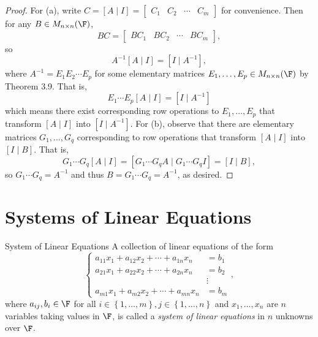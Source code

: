 \documentclass[linearalgebra]{subfiles}
\begin{document}
    \begin{proof}
        For (a), write $C = [A\mid I] = \begin{bmatrix} C_1 & C_2 & \cdots & C_m \end{bmatrix}$ for convenience. Then for any $B\in M_{n\times n}(\F)$,
        \begin{equation*}
            BC = 
            \begin{bmatrix}
                BC_1 & BC_2 & \cdots & BC_m
            \end{bmatrix},
        \end{equation*}
        so
        \begin{equation*}
            A^{-1}[A\mid I] = [I\mid A^{-1}],
        \end{equation*}
        where $A^{-1} = E_1E_2\cdots E_p$ for some elementary matrices $E_1, \ldots, E_p\in M_{n\times n}(\F)$ by Theorem 3.9. That is,
        \begin{equation*}
            E_1\cdots E_p [A\mid I] = [I\mid A^{-1}]
        \end{equation*}
        which means there exist corresponding row operations to $E_1, \ldots, E_p$ that transform $[A\mid I]$ into $[I\mid A^{-1}]$. For (b), observe that there are elementary matrices $G_1, \ldots, G_q$ corresponding to row operations that transform $[A\mid I]$ into $[I\mid B]$. That is,
        \begin{equation*}
            G_1\cdots G_q [A\mid I] = [G_1\cdots G_qA\mid G_1\cdots G_qI] = [I\mid B],
        \end{equation*}
        so $G_1\cdots G_q = A^{-1}$ and thus $B = G_1\cdots G_q = A^{-1}$, as desired.
    \end{proof}

    \section{Systems of Linear Equations}

    \begin{definition}{System of Linear Equations}{}
        A collection of linear equations of the form
        \begin{equation*}
            \begin{cases}
                a_{11}x_1 + a_{12}x_2 + \cdots + a_{1n}x_n & = b_1 \\
                a_{21}x_1 + a_{22}x_2 + \cdots + a_{2n}x_n & = b_2 \\
                                                           & \vdots \\
                a_{m1}x_1 + a_{m2}x_2 + \cdots + a_{mn}x_n & = b_m
            \end{cases},
        \end{equation*}
        where $a_{ij}, b_i\in \F$ for all $i\in \left\lbrace 1, \ldots, m \right\rbrace, j\in \left\lbrace 1, \ldots, n \right\rbrace$ and $x_1, \ldots, x_n$ are $n$ variables taking values in $\F$, is called a \emph{system of linear equations} in $n$ unknowns over $\F$.
    \end{definition}
\end{document}
